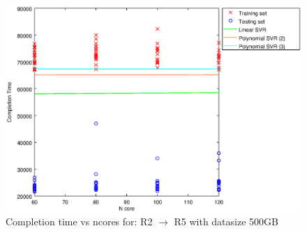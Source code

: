 
\begin {figure}[hbtp]
\centering
\includegraphics[width=\textwidth]{output/R2_R5_500_ALL_FEATURES/plot_R2_R5_500_bestmodels.eps}
\caption{Completion time vs ncores for: R2 $\rightarrow$ R5 with datasize 500GB}
\label{fig:coreonly_linear_R2_R5_500}
\end {figure}
